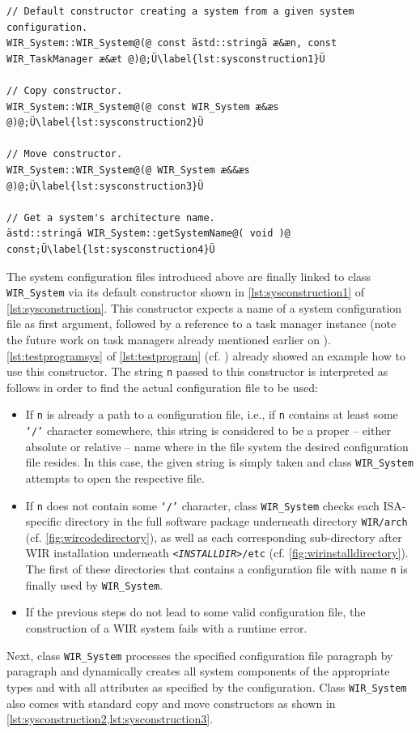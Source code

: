 \begin{lstlisting}[style=code,float=t,caption={Constructors and Methods for Name Handling of Class \texttt{WIR\_System}},label=lst:sysconstruction]
// Default constructor creating a system from a given system configuration.
WIR_System::WIR_System@(@ const ästd::stringä æ&æn, const WIR_TaskManager æ&æt @)@;Ü\label{lst:sysconstruction1}Ü

// Copy constructor.
WIR_System::WIR_System@(@ const WIR_System æ&æs @)@;Ü\label{lst:sysconstruction2}Ü

// Move constructor.
WIR_System::WIR_System@(@ WIR_System æ&&æs @)@;Ü\label{lst:sysconstruction3}Ü

// Get a system's architecture name.
ästd::stringä WIR_System::getSystemName@( void )@ const;Ü\label{lst:sysconstruction4}Ü
\end{lstlisting}

The system configuration files introduced above are finally linked to class \texttt{WIR\_System} via its default constructor shown in \cref{lst:sysconstruction1} of \cref{lst:sysconstruction}.
This constructor expects a name of a system configuration file as first argument, followed by a reference to a task manager instance (note the future work on task managers already mentioned earlier on ).
\cref{lst:testprogramsys} of \cref{lst:testprogram} (cf. ) already showed an example how to use this constructor.
The string \texttt{n} passed to this constructor is interpreted as follows in order to find the actual configuration file to be used:
\begin{itemize}
  \item If \texttt{n} is already a path to a configuration file, i.e., if \texttt{n} contains at least some \texttt{`/'} character somewhere, this string is considered to be a proper -- either absolute or relative -- name where in the file system the desired configuration file resides.
  In this case, the given string is simply taken and class \texttt{WIR\_System} attempts to open the respective file.
  \item If \texttt{n} does not contain some \texttt{`/'} character, class \texttt{WIR\_System} checks each \gls{ISA}-specific directory in the full software package underneath directory \texttt{WIR/arch} (cf. \cref{fig:wircodedirectory}), as well as each corresponding sub-directory after \gls{WIR} installation underneath \texttt{\emph{<INSTALLDIR>}/etc} (cf. \cref{fig:wirinstalldirectory}). The first of these directories that contains a configuration file with name \texttt{n} is finally used by \texttt{WIR\_System}.
  \item If the previous steps do not lead to some valid configuration file, the construction of a \gls{WIR} system fails with a runtime error.
\end{itemize}
Next, class \texttt{WIR\_System} processes the specified configuration file paragraph by paragraph and dynamically creates all system components of the appropriate types and with all attributes as specified by the configuration.
Class \texttt{WIR\_System} also comes with standard copy and move constructors as shown in \cref{lst:sysconstruction2,lst:sysconstruction3}.

